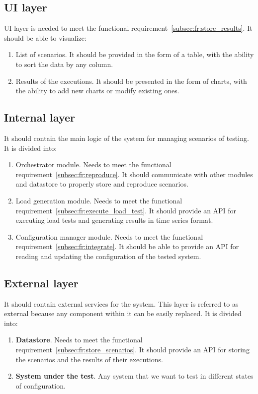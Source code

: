 \subsection{UI layer}\label{subsec:ui_layer}
UI layer is needed to meet the functional requirement~\ref{subsec:fr:store_results}.
It should be able to visualize:
\begin{enumerate}
    \item List of scenarios. It should be provided in the form of a table, with the ability to sort the data by any column.
    \item Results of the executions. It should be presented in the form of charts, with the ability to add new charts or modify existing ones.
\end{enumerate}

\subsection{Internal layer}\label{subsec:internal_layer}
It should contain the main logic of the system for managing scenarios of testing. It is divided into:
\begin{enumerate}
    \item Orchestrator module. Needs to meet the functional requirement~\ref{subsec:fr:reproduce}. It should communicate with other modules and datastore to properly store and reproduce scenarios.
    \item Load generation module. Needs to meet the functional requirement~\ref{subsec:fr:execute_load_test}. It should provide an API for executing load tests and generating results in time series format.
    \item Configuration manager module. Needs to meet the functional requirement~\ref{subsec:fr:integrate}. It should be able to provide an API for reading and updating the configuration of the tested system.
\end{enumerate}

\subsection{External layer}\label{subsec:external_layer}
It should contain external services for the system. This layer is referred to as external because any component within it can be easily replaced. It is divided into:
\begin{enumerate}
    \item \textbf{Datastore}. Needs to meet the functional requirement~\ref{subsec:fr:store_scenarios}. It should provide an API for storing the scenarios and the results of their executions.
    \item \textbf{System under the test}. Any system that we want to test in different states of configuration.
\end{enumerate}